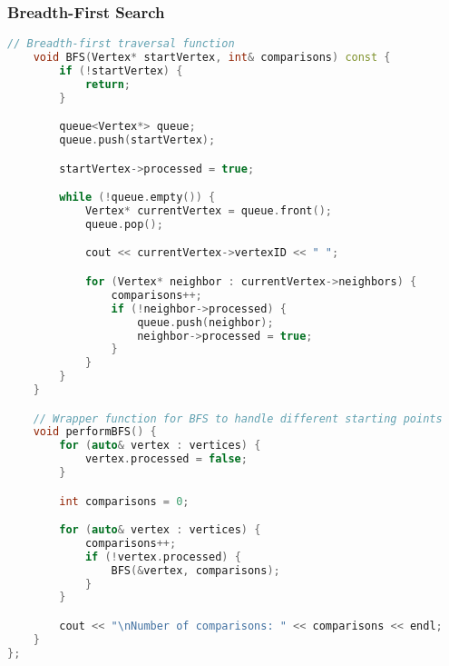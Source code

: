\documentclass[letterpaper, 10pt,DIV=13]{scrartcl}
\numberwithin{equation}{section} %
\numberwithin{figure}{section} %
\numberwithin{table}{section} %
\begin{document}
\subsubsection{Breadth-First Search}
\begin{linenumbers}
\begin{lstlisting}[language=C++, caption={Breadth-First Search}, label={code:example}]
    // Breadth-first traversal function
    void BFS(Vertex* startVertex, int& comparisons) const {
        if (!startVertex) {
            return;
        }

        queue<Vertex*> queue;
        queue.push(startVertex);

        startVertex->processed = true;

        while (!queue.empty()) {
            Vertex* currentVertex = queue.front();
            queue.pop();

            cout << currentVertex->vertexID << " ";

            for (Vertex* neighbor : currentVertex->neighbors) {
                comparisons++;
                if (!neighbor->processed) {
                    queue.push(neighbor);
                    neighbor->processed = true;
                }
            }
        }
    }

    // Wrapper function for BFS to handle different starting points
    void performBFS() {
        for (auto& vertex : vertices) {
            vertex.processed = false;
        }

        int comparisons = 0;

        for (auto& vertex : vertices) {
            comparisons++;
            if (!vertex.processed) {
                BFS(&vertex, comparisons);
            }
        }

        cout << "\nNumber of comparisons: " << comparisons << endl;
    }
};

\end{lstlisting}
\end{linenumbers}
\nolinenumbers
\end{document}
